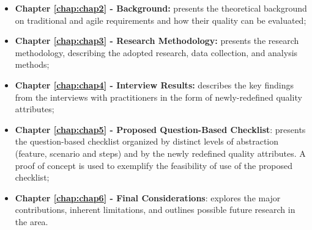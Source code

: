 \begin{itemize}
    \item \textbf{Chapter \ref{chap:chap2} - Background:} presents the theoretical background on traditional and agile requirements and how their quality can be evaluated;
    \item \textbf{Chapter \ref{chap:chap3} - Research Methodology:} presents the research methodology, describing the adopted research, data collection, and analysis methods;
    \item \textbf{Chapter \ref{chap:chap4} - Interview Results:} describes the key findings from the interviews with practitioners in the form of newly-redefined quality attributes;
    \item \textbf{Chapter \ref{chap:chap5} - Proposed Question-Based Checklist}: presents the question-based checklist organized by distinct levels of abstraction (feature, scenario and steps) and by the newly redefined quality attributes. A proof of concept is used to exemplify the feasibility of use of the proposed checklist;
    \item \textbf{Chapter \ref{chap:chap6} - Final Considerations}: explores the major contributions, inherent limitations, and outlines possible future research in the area.
\end{itemize}
